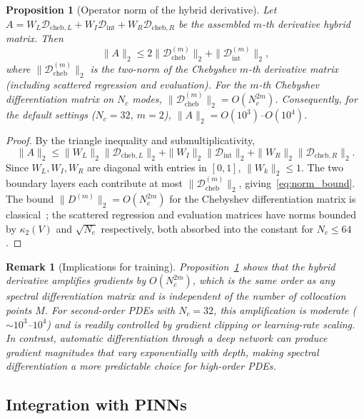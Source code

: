\documentclass[sn-mathphys,Numbered]{sn-jnl}
\theoremstyle{thmstyleone}
\newtheorem{proposition}[theorem]{Proposition}
\theoremstyle{thmstyletwo}
\newtheorem{remark}{Remark}
\theoremstyle{thmstylethree}
\newcommand{\calD}{\mathcal{D}}
\newcommand{\cheb}{\mathrm{cheb}}
\begin{document}
\begin{proposition}[Operator norm of the hybrid derivative]\label{prop:stability}
Let $A=W_L\calD_{\cheb,L}+W_I\calD_{\mathrm{int}}+W_R\calD_{\cheb,R}$ be the assembled $m$-th derivative hybrid matrix. Then
\begin{equation}
    \|A\|_2 \leq 2\|\calD_{\cheb}^{(m)}\|_2 + \|\calD_{\mathrm{int}}^{(m)}\|_2,
    \label{eq:norm_bound}
\end{equation}
where $\|\calD_{\cheb}^{(m)}\|_2$ is the two-norm of the Chebyshev $m$-th derivative matrix (including scattered regression and evaluation). For the $m$-th Chebyshev differentiation matrix on $N_c$ modes, $\|\calD_{\cheb}^{(m)}\|_2=O(N_c^{2m})$. Consequently, for the default settings ($N_c=32$, $m=2$), $\|A\|_2=O(10^3)$--$O(10^4)$.
\end{proposition}
\begin{proof}
By the triangle inequality and submultiplicativity,
\[
\|A\|_2 \leq \|W_L\|_2\|\calD_{\cheb,L}\|_2 + \|W_I\|_2\|\calD_{\mathrm{int}}\|_2 + \|W_R\|_2\|\calD_{\cheb,R}\|_2.
\]
Since $W_L,W_I,W_R$ are diagonal with entries in $[0,1]$, $\|W_k\|_2\leq 1$. The two boundary layers each contribute at most $\|\calD_{\cheb}^{(m)}\|_2$, giving~\eqref{eq:norm_bound}. The bound $\|D^{(m)}\|_2=O(N_c^{2m})$ for the Chebyshev differentiation matrix is classical~\cite{trefethen2000spectral}; the scattered regression and evaluation matrices have norms bounded by $\kappa_2(V)$ and $\sqrt{N_c}$ respectively, both absorbed into the constant for $N_c\leq 64$.
\end{proof}

\begin{remark}[Implications for training]
Proposition~\ref{prop:stability} shows that the hybrid derivative amplifies gradients by $O(N_c^{2m})$, which is the same order as any spectral differentiation matrix and is independent of the number of collocation points $M$. For second-order PDEs with $N_c=32$, this amplification is moderate ($\sim 10^3$--$10^4$) and is readily controlled by gradient clipping or learning-rate scaling. In contrast, automatic differentiation through a deep network can produce gradient magnitudes that vary exponentially with depth, making spectral differentiation a more predictable choice for high-order PDEs.
\end{remark}

\subsection{Integration with PINNs}\label{subsec:pinn}
\end{document}
